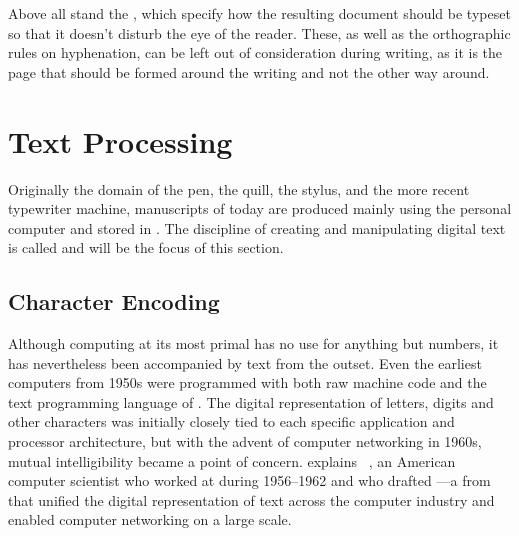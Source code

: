 Above all stand the ,
which specify how the resulting document should be typeset so that it doesn't
disturb the eye of the reader. These, as well as the orthographic rules on
hyphenation, can be left out of consideration during writing, as it is the page
that should be formed around the writing and not the other way around.

\section{Text Processing}
Originally the domain of the pen, the quill, the stylus, and the more recent
typewriter machine, manuscripts of today are produced mainly using the personal
computer and stored in . The discipline of creating and
manipulating digital text is called  and will be the focus
of this section.

\subsection{Character Encoding}
Although computing at its most primal has no use for anything but numbers, it
has nevertheless been accompanied by text from the outset. Even the
earliest computers from 1950s were programmed with both raw machine code and
the text programming language of . The digital representation
of letters, digits and other characters was initially closely tied
to each specific application and processor architecture, but with the advent of
computer networking in 1960s, mutual intelligibility became a point of concern.
 explains ~\cite{brandel99}, an American computer scientist who worked at
 during 1956--1962 and who drafted ---a
 from \citeyear{asa63} that unified the digital
representation of text across the computer industry and enabled computer
networking on a large scale.

